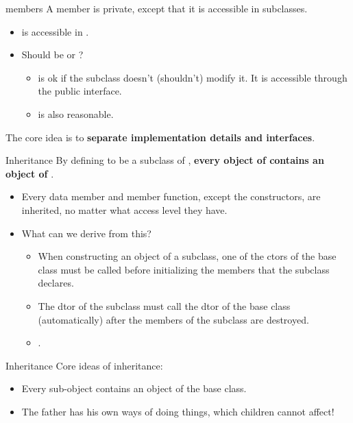 \documentclass{beamer}
\begin{document}
\begin{frame}{ members}
    A  member is private, except that it is accessible in subclasses.
    \begin{itemize}
        \item {} is accessible in .
        \item Should  be  or ?
        \begin{itemize}
            \item \private is ok if the subclass doesn't (shouldn't) modify it. It is accessible through the public  interface.
            \item {} is also reasonable.
        \end{itemize}
    \end{itemize}
    The core idea is to \textbf{separate implementation details and interfaces}.
\end{frame}

\begin{frame}[fragile]{Inheritance}
    By defining  to be a subclass of , \textbf{every object of  contains an object of }.
    \begin{itemize}
        \item Every data member and member function, except the constructors, are inherited, no matter what access level they have.
        \item What can we derive from this?
        \begin{itemize}
            \item When constructing an object of a subclass, one of the ctors of the base class must be called before initializing the members that the subclass declares.
            \item The dtor of the subclass must call the dtor of the base class (automatically) after the members of the subclass are destroyed.
            \item {}.
        \end{itemize}
    \end{itemize}
\end{frame}

\begin{frame}{Inheritance}
    Core ideas of inheritance:
    \begin{itemize}
        \item Every sub-object contains an object of the base class.
        \item The father has his own ways of doing things, which children cannot affect!
    \end{itemize}
\end{frame}
\end{document}
